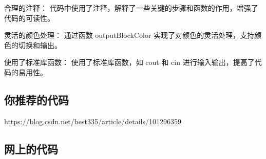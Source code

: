 合理的注释： 代码中使用了注释，解释了一些关键的步骤和函数的作用，增强了代码的可读性。

灵活的颜色处理： 通过函数 outputBlockColor 实现了对颜色的灵活处理，支持颜色的切换和输出。

使用了标准库函数： 使用了标准库函数，如 cout 和 cin 进行输入输出，提高了代码的易用性。

\subsection{你推荐的代码}

\href{201909-3 字符画}{https://blog.csdn.net/best335/article/details/101296359}

\subsection{网上的代码}
